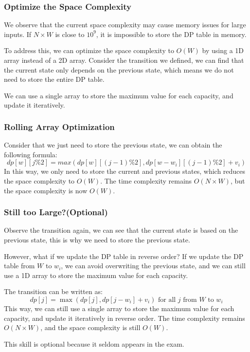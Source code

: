 \documentclass[xcolor=dvipsnames]{beamer}
\begin{document}
    \begin{frame}
        \frametitle{Optimize the Space Complexity}
        We observe that the current space complexity may cause memory issues for large inputs. If $N\times W$ is close to $10^9$, it is impossible to store the DP table in memory.

        To address this, we can optimize the space complexity to $O(W)$ by using a 1D array instead of a 2D array. Consider the transition we defined, we can find that the current state only depends on the previous state, which means we do not need to store the entire DP table.

        We can use a single array to store the maximum value for each capacity, and update it iteratively.
    \end{frame}

    \begin{frame}
        \frametitle{Rolling Array Optimization}
        Consider that we just need to store the previous state, we can obtain the following formula:
        $$
        dp[w][j\%2]=max(dp[w][(j-1)\%2], dp[w-w_i][(j-1)\%2]+v_i)
        $$
        In this way, we only need to store the current and previous states, which reduces the space complexity to $O(W)$.
        The time complexity remains $O(N \times W)$, but the space complexity is now $O(W)$.
    \end{frame}

    \begin{frame}
        \frametitle{Still too Large?(Optional)}
        Observe the transition again, we can see that the current state is based on the previous state, this is why we need to store the previous state.

        However, what if we update the DP table in reverse order?
        If we update the DP table from $W$ to $w_i$, we can avoid overwriting the previous state, and we can still use a 1D array to store the maximum value for each capacity.

        The transition can be written as:
        $$ dp[j] = \max(dp[j], dp[j-w_i] + v_i) \text{ for all } j \text{ from } W \text{ to } w_i $$
        This way, we can still use a single array to store the maximum value for each capacity,
        and update it iteratively in reverse order.
        The time complexity remains $O(N \times W)$, and the space complexity is still $O(W)$.

        This skill is optional because it seldom appears in the exam.
    \end{frame}
\end{document}
